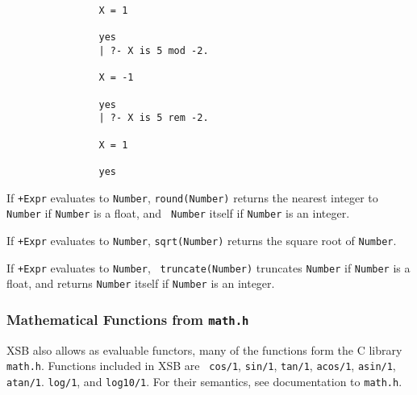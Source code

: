 \begin{description}
{\begin{verbatim}
                X = 1

                yes
                | ?- X is 5 mod -2.

                X = -1

                yes
                | ?- X is 5 rem -2.

                X = 1

                yes
  \end{verbatim}}

 If
{\tt +Expr} evaluates to {\tt Number}, {\tt round(Number)} returns the
nearest integer to {\tt Number} if {\tt Number} is a float, and {\tt
Number} itself if {\tt Number} is an integer.

If {\tt +Expr} evaluates to {\tt Number}, {\tt sqrt(Number)}
returns the square root of {\tt Number}.

 If {\tt +Expr} evaluates to {\tt Number}, {\tt
truncate(Number)} truncates {\tt Number} if {\tt Number} is a float,
and returns {\tt Number} itself if {\tt Number} is an integer.
\end{description}

\subsubsection{Mathematical Functions from {\tt math.h}}
  
  
 

XSB also allows as evaluable functors, many of the functions form the
C library {\tt math.h}.  Functions included in XSB \version{} are {\tt
cos/1}, {\tt sin/1}, {\tt tan/1}, {\tt acos/1}, {\tt asin/1}, {\tt
atan/1}. {\tt log/1}, and {\tt log10/1}.  For their semantics, see
documentation to {\tt math.h}.

